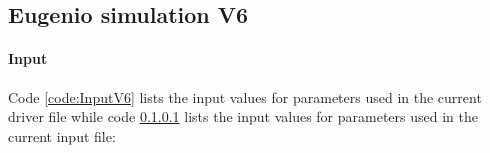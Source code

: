 \documentclass{article}
\begin{document}
\FloatBarrier  %
\subsection{Eugenio simulation V6}
\paragraph{Input} Code \ref{code:InputV6} lists the input values for parameters used in the current driver file while code \ref{} lists the input values for parameters used in the current input file:


\end{document}
